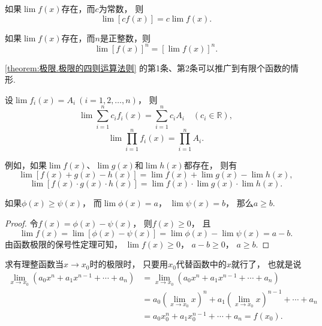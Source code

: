 \begin{corollary}
如果\(\lim f(x)\)存在，而\(c\)为常数，
则\[\lim [c f(x)] = c \lim f(x).\]
\end{corollary}

\begin{corollary}
如果\(\lim f(x)\)存在，而\(n\)是正整数，则\[\lim [f(x)]^n = [\lim f(x)]^n.\]
\end{corollary}

\cref{theorem:极限.极限的四则运算法则} 的第1条、第2条可以推广到有限个函数的情形.
\begin{corollary}
设\(\lim f_i(x) = A_i\ (i=1,2,\dotsc,n)\)，
则\[
	\lim \sum_{i=1}^n c_i f_i(x) = \sum_{i=1}^n c_i A_i
	\quad(c_i\in\mathbb{R}),
\]\[
	\lim \prod_{i=1}^n f_i(x) = \prod_{i=1}^n A_i.
\]
\end{corollary}
例如，如果\(\lim f(x)\)、\(\lim g(x)\)和\(\lim h(x)\)都存在，
则有\[
	\lim[f(x) + g(x) - h(x)] = \lim f(x) + \lim g(x) - \lim h(x),
\]\[
	\lim[f(x) \cdot g(x) \cdot h(x)] = \lim f(x) \cdot \lim g(x) \cdot \lim h(x).
\]

\begin{theorem}
如果\(\phi(x) \geq \psi(x)\)，
而\(\lim \phi(x)=a\)，
\(\lim \psi(x)=b\)，
那么\(a \geq b\).
\begin{proof}
令\(f(x) = \phi(x) - \psi(x)\)，
则\(f(x) \geq 0\)，
且\[
	\lim f(x) = \lim[\phi(x) - \psi(x)]
	= \lim \phi(x) - \lim \psi(x)
	= a - b.
\]
由函数极限的保号性定理可知，
\(\lim f(x) \geq 0\)，
\(a - b \geq 0\)，
\(a \geq b\).
\end{proof}
\end{theorem}

\begin{example}\label{example:极限.有理整函数在一点的极限}
求有理整函数当\(x\to x_0\)时的极限时，
只要用\(x_0\)代替函数中的\(x\)就行了，
也就是说
\def\lx{\left(\lim_{x \to x_0} x\right)}
\begin{align*}
	\lim_{x \to x_0} (a_0 x^n + a_1 x^{n-1} + \dotsb + a_n)
	&= \lim_{x \to x_0}{(a_0 x^n + a_1 x^{n-1} + \dotsb + a_n)} \\
	&= a_0 \lx^n + a_1 \lx^{n-1} + \dotsb + a_n \\
	&= a_0 x_0^n + a_1 x_0^{n-1} + \dotsb + a_n
	= f(x_0).
\end{align*}
\end{example}

